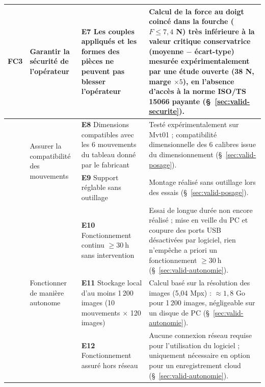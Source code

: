 \begin{landscape}
\begin{longtable}{|>{\raggedright\arraybackslash}p{1cm}|p{4.5cm}|p{7.5cm}|p{8cm}|}
FC3 & Garantir la sécurité de l'opérateur
    & \cellcolor{resPartiel}\rule[-0.4\baselineskip]{0pt}{1.8\baselineskip}\textbf{E7} Les couples appliqués et les formes des pièces ne peuvent pas blesser l'opérateur
    & \rule[-0.4\baselineskip]{0pt}{1.8\baselineskip}Calcul de la force au doigt coincé dans la fourche ($F \leq 7{,}4$ N) très inférieure à la valeur critique conservatrice (moyenne $-$ écart-type) mesurée expérimentalement par une étude ouverte (38 N, marge $\times 5$), en l'absence d'accès à la norme ISO/TS 15066 payante (§~\ref{sec:valid-securite}). \\
\hline

\multirow{2}{*}{FC4} & \multirow{2}{4.5cm}{Assurer la compatibilité des mouvements}
    & \cellcolor{resConforme}\rule[-0.4\baselineskip]{0pt}{1.8\baselineskip}\textbf{E8} Dimensions compatibles avec les 6 mouvements du tableau donné par le fabricant
    & \rule[-0.4\baselineskip]{0pt}{1.8\baselineskip}Testé expérimentalement sur Mvt01 ; compatibilité dimensionnelle des 6 calibres issue du dimensionnement (§~\ref{sec:valid-posage}). \\
\cline{3-4}
 & & \cellcolor{resConforme}\rule[-0.4\baselineskip]{0pt}{1.8\baselineskip}\textbf{E9} Support réglable sans outillage
    & \rule[-0.4\baselineskip]{0pt}{1.8\baselineskip}Montage réalisé sans outillage lors des essais (§~\ref{sec:valid-posage}). \\
\hline

\multirow{3}{*}{FC5} & \multirow{3}{4.5cm}{Fonctionner de manière autonome}
    & \cellcolor{resPartiel}\rule[-0.4\baselineskip]{0pt}{1.8\baselineskip}\textbf{E10} Fonctionnement continu $\geq 30\ \mathrm{h}$ sans intervention
    & \rule[-0.4\baselineskip]{0pt}{1.8\baselineskip}Essai de longue durée non encore réalisé ; mise en veille du PC et coupure des ports USB désactivées par logiciel, rien n'empêche a priori un fonctionnement $\geq 30\ \mathrm{h}$ (§~\ref{sec:valid-autonomie}). \\
\cline{3-4}
 & & \cellcolor{resConforme}\rule[-0.4\baselineskip]{0pt}{1.8\baselineskip}\textbf{E11} Stockage local d'au moins 1\,200 images (10 mouvements $\times$ 120 images)
    & \rule[-0.4\baselineskip]{0pt}{1.8\baselineskip}Calcul basé sur la résolution des images (5,04 Mpx) : $\approx 1{,}8$ Go pour 1\,200 images, négligeable sur un disque de PC (§~\ref{sec:valid-autonomie}). \\
\cline{3-4}
 & & \cellcolor{resConforme}\rule[-0.4\baselineskip]{0pt}{1.8\baselineskip}\textbf{E12} Fonctionnement assuré hors réseau
    & \rule[-0.4\baselineskip]{0pt}{1.8\baselineskip}Aucune connexion réseau requise pour l'utilisation du logiciel ; uniquement nécessaire en option pour un enregistrement cloud (§~\ref{sec:valid-autonomie}). \\
\hline


\end{longtable}
\end{landscape}
